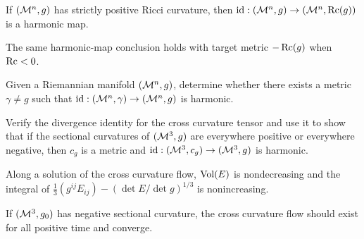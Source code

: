 \begin{corollary}
\label{ch03-cor-positive-ricci-identity-harmonic}
If \((\mathcal{M}^n,g)\) has strictly positive Ricci curvature, then \(\mathrm{id}:(\mathcal{M}^n,g)\to(\mathcal{M}^n,\operatorname{Rc}(g))\) is a harmonic map.
\end{corollary}

\begin{remark}
\label{ch03-rem-negative-ricci-target}
The same harmonic-map conclusion holds with target metric \(-\operatorname{Rc}(g)\) when \(\operatorname{Rc}<0\).
\end{remark}

\begin{remark}
\label{ch03-prob-cross-curvature-harmonic-map}
Given a Riemannian manifold \((\mathcal{M}^n,g)\), determine whether there exists a metric \(\gamma\neq g\) such that \(\mathrm{id}:(\mathcal{M}^n,\gamma)\to(\mathcal{M}^n,g)\) is harmonic.
\end{remark}

\begin{remark}
\label{ch03-ex-cross-curvature-harmonic-map}
Verify the divergence identity for the cross curvature tensor and use it to show that if the sectional curvatures of \((\mathcal{M}^3,g)\) are everywhere positive or everywhere negative, then \(c_g\) is a metric and \(\mathrm{id}:(\mathcal{M}^3,c_g)\to(\mathcal{M}^3,g)\) is harmonic.
\end{remark}

\begin{proposition}
\label{ch03-prop-cross-curvature-monotonicity}
Along a solution of the cross curvature flow, \(\operatorname{Vol}(E)\) is nondecreasing and the integral of \(\frac13(g^{ij}E_{ij})-(\det E/\det g)^{1/3}\) is nonincreasing.
\end{proposition}

\begin{conjecture}
\label{ch03-conj-cross-curvature-global-existence}
If \((\mathcal{M}^3,g_0)\) has negative sectional curvature, the cross curvature flow should exist for all positive time and converge.
\end{conjecture}

